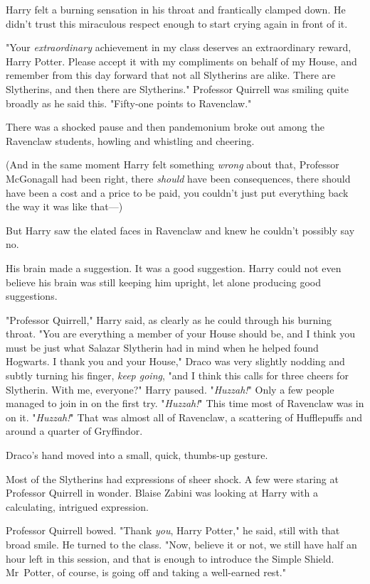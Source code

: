 Harry felt a burning sensation in his throat and frantically clamped down. He
didn't trust this miraculous respect enough to start crying again in front of
it.

"Your \emph{extraordinary} achievement in my class deserves an extraordinary
reward, Harry Potter. Please accept it with my compliments on behalf of my
House, and remember from this day forward that not all Slytherins are alike.
There are Slytherins, and then there are Slytherins." Professor Quirrell was
smiling quite broadly as he said this. "Fifty-one points to Ravenclaw."

There was a shocked pause and then pandemonium broke out among the Ravenclaw
students, howling and whistling and cheering.

(And in the same moment Harry felt something \emph{wrong} about that, Professor
McGonagall had been right, there \emph{should} have been consequences, there
should have been a cost and a price to be paid, you couldn't just put
everything back the way it was like that---)

But Harry saw the elated faces in Ravenclaw and knew he couldn't possibly say
no.

His brain made a suggestion. It was a good suggestion. Harry could not even
believe his brain was still keeping him upright, let alone producing good
suggestions.

"Professor Quirrell," Harry said, as clearly as he could through his burning
throat. "You are everything a member of your House should be, and I think you
must be just what Salazar Slytherin had in mind when he helped found Hogwarts.
I thank you and your House," Draco was very slightly nodding and subtly turning
his finger, \emph{keep going}, "and I think this calls for three cheers for
Slytherin. With me, everyone?" Harry paused. "\emph{Huzzah!}" Only a few people
managed to join in on the first try. "\emph{Huzzah!}" This time most of
Ravenclaw was in on it. "\emph{Huzzah!}" That was almost all of Ravenclaw, a
scattering of Hufflepuffs and around a quarter of Gryffindor.

Draco's hand moved into a small, quick, thumbs-up gesture.

Most of the Slytherins had expressions of sheer shock. A few were staring at
Professor Quirrell in wonder. Blaise Zabini was looking at Harry with a
calculating, intrigued expression.

Professor Quirrell bowed. "Thank \emph{you}, Harry Potter," he said, still with
that broad smile. He turned to the class. "Now, believe it or not, we still
have half an hour left in this session, and that is enough to introduce the
Simple Shield. Mr~Potter, of course, is going off and taking a well-earned
rest."

